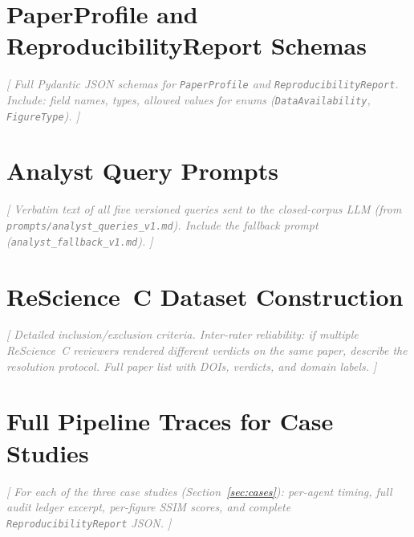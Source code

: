 \documentclass{article}
\newcommand{\outline}[1]{\textcolor{gray}{\textit{[#1]}}}
\begin{document}



\appendix

\section{PaperProfile and ReproducibilityReport Schemas}
\label{app:schemas}

\outline{%
  Full Pydantic JSON schemas for \texttt{PaperProfile} and
  \texttt{ReproducibilityReport}.
  Include: field names, types, allowed values for enums
  (\texttt{DataAvailability}, \texttt{FigureType}).
}

\section{Analyst Query Prompts}
\label{app:prompts}

\outline{%
  Verbatim text of all five versioned queries sent to the closed-corpus
  LLM (from \texttt{prompts/analyst\_queries\_v1.md}).
  Include the fallback prompt (\texttt{analyst\_fallback\_v1.md}).
}

\section{ReScience~C Dataset Construction}
\label{app:dataset}

\outline{%
  Detailed inclusion/exclusion criteria.
  Inter-rater reliability: if multiple ReScience~C reviewers rendered
  different verdicts on the same paper, describe the resolution protocol.
  Full paper list with DOIs, verdicts, and domain labels.
}

\section{Full Pipeline Traces for Case Studies}
\label{app:traces}

\outline{%
  For each of the three case studies (Section~\ref{sec:cases}):
  per-agent timing, full audit ledger excerpt, per-figure SSIM scores,
  and complete \texttt{ReproducibilityReport} JSON.
}

\end{document}
